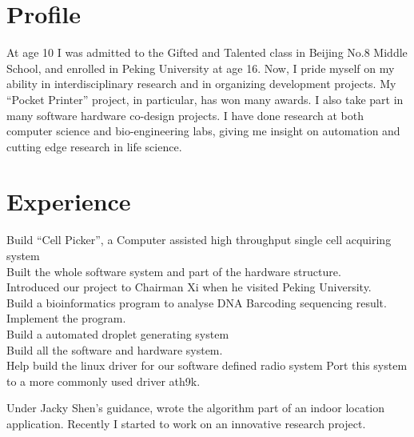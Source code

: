 \documentclass[]{deedy-resume-openfont}
\begin{document}
\begin{minipage}[t]{0.62\textwidth} 

\section{Profile}
At age 10 I was admitted to the Gifted and Talented class in Beijing No.8 Middle School, and enrolled in Peking University at age 16. Now, I pride myself on my ability in interdisciplinary research and in organizing development projects. My “Pocket Printer” project, in particular, has won many awards. I also take part in many software hardware co-design projects. I have done research at both computer science and bio-engineering labs, giving me insight on automation and cutting edge research in life science.


\section{Experience}
Build “Cell Picker”, a Computer assisted high throughput single cell acquiring system\\
Built the whole software system and part of the hardware structure.\\
Introduced our project to Chairman Xi when he visited Peking University.\\
Build a bioinformatics program to analyse DNA Barcoding sequencing result.\\
Implement the program.\\
Build a automated droplet generating system\\
Build all the software and hardware system.\\

Help build the linux driver for our software defined radio system
Port this system to a more commonly used driver ath9k.

Under Jacky Shen's guidance, wrote the algorithm part of an indoor location application. Recently I started to work on an innovative research project.


\end{minipage}
\end{document}
